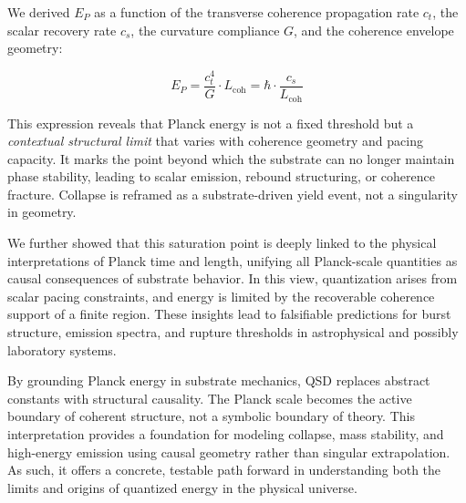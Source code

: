 \documentclass[entropy,article,submit,pdftex,moreauthors]{Definitions/mdpi}
\begin{document}
We derived $E_P$ as a function of the transverse coherence propagation rate $c_t$, the scalar recovery rate $c_s$, the curvature compliance $G$, and the coherence envelope geometry:

\begin{equation}
E_P = \frac{c_t^4}{G} \cdot L_{\text{coh}} = \hbar \cdot \frac{c_s}{L_{\text{coh}}}
\end{equation}

This expression reveals that Planck energy is not a fixed threshold but a \textit{contextual structural limit} that varies with coherence geometry and pacing capacity. It marks the point beyond which the substrate can no longer maintain phase stability, leading to scalar emission, rebound structuring, or coherence fracture. Collapse is reframed as a substrate-driven yield event, not a singularity in geometry.

We further showed that this saturation point is deeply linked to the physical interpretations of Planck time and length, unifying all Planck-scale quantities as causal consequences of substrate behavior. In this view, quantization arises from scalar pacing constraints, and energy is limited by the recoverable coherence support of a finite region. These insights lead to falsifiable predictions for burst structure, emission spectra, and rupture thresholds in astrophysical and possibly laboratory systems.

By grounding Planck energy in substrate mechanics, QSD replaces abstract constants with structural causality. The Planck scale becomes the active boundary of coherent structure, not a symbolic boundary of theory. This interpretation provides a foundation for modeling collapse, mass stability, and high-energy emission using causal geometry rather than singular extrapolation. As such, it offers a concrete, testable path forward in understanding both the limits and origins of quantized energy in the physical universe.

\vspace{6pt} 


\end{document}
